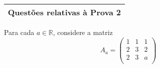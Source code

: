 \documentclass[11pt]{exam}
\begin{document}
   \begin{center}
  \begin{tabular}{|l|}
    \hline
    {\bf Questões relativas à Prova 2} \\
    \hline
     \end{tabular}
  \end{center}
  
\begin{questions}
  \question
  Para cada $a \in \mathbb{R}$, considere a matriz
     $$ A_{a}= 
        \begin{pmatrix}
         1 & 1 & 1\\
         2 & 3 & 2\\
         2 & 3 & a\\ 
        \end{pmatrix}  
     $$
     

\end{questions}
\end{document}
